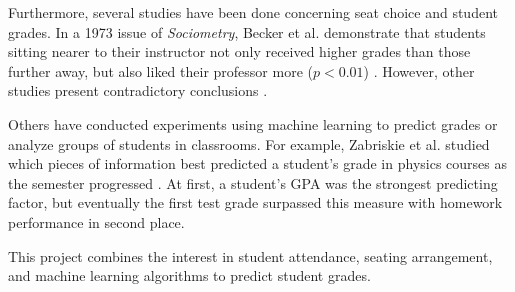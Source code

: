 Furthermore, several studies have been done concerning seat choice and student grades. In a 1973 issue of {\it Sociometry}, Becker et al. demonstrate that students sitting nearer to their instructor not only received higher grades than those further away, but also liked their professor more ($p<0.01$) \cite{becker1973}. However, other studies present contradictory conclusions \cite{kalinowski2007}.

Others have conducted experiments using machine learning to predict grades or analyze groups of students in classrooms. For example, Zabriskie et al. studied which pieces of information best predicted a student's grade in physics courses as the semester progressed \cite{zabriskie2019}. At first, a student's GPA was the strongest predicting factor, but eventually the first test grade surpassed this measure with homework performance in second place.

This project combines the interest in student attendance, seating arrangement, and machine learning algorithms to predict student grades.


